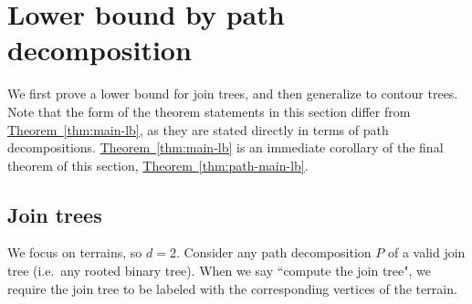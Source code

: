 \documentclass[11pt]{article}
\theoremstyle{definition}
\newcommand{\Thm}[1]{\hyperref[thm:#1]{Theorem~\ref*{thm:#1}}} %
\begin{document}



\section{Lower bound by path decomposition}
\label{sec:lb}
We first prove a lower bound for join trees, and then generalize to contour trees.
Note that the form of the theorem statements in this section differ from \Thm{main-lb}, 
as they are stated directly in terms of path decompositions.  \Thm{main-lb} 
is an immediate corollary of the final theorem of this section, \Thm{path-main-lb}.

\subsection{Join trees}

 
We focus on terrains, so $d=2$.
Consider any path decomposition $P$ of a valid join tree (i.e.\ any rooted binary tree).
When we say ``compute the join tree", we require the join tree to
be labeled with the corresponding vertices of the terrain.
\end{document}
